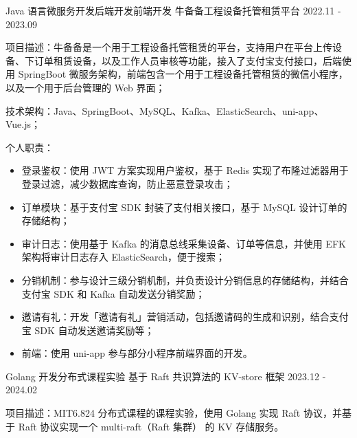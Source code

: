 \begin{cventries}
  \cventry
    {Java 语言微服务开发{\enskip\cdotp\enskip}后端开发{\enskip\cdotp\enskip}前端开发} %
    {牛备备工程设备托管租赁平台} %
    {2022.11 - 2023.09} %
    {} %
    {
      \begin{cvitems}
        \item {项目描述：牛备备是一个用于工程设备托管租赁的平台，支持用户在平台上传设备、下订单租赁设备，以及工作人员审核等功能，接入了支付宝支付接口，后端使用 SpringBoot 微服务架构，前端包含一个用于工程设备托管租赁的微信小程序，以及一个用于后台管理的 Web 界面；}
        \item {技术架构：Java、SpringBoot、MySQL、Kafka、ElasticSearch、uni-app、Vue.js；}
        \item {个人职责：}
          \begin{itemize}
            \item {登录鉴权：使用 JWT 方案实现用户鉴权，基于 Redis 实现了布隆过滤器用于登录过滤，减少数据库查询，防止恶意登录攻击；}
            \item {订单模块：基于支付宝 SDK 封装了支付相关接口，基于 MySQL 设计订单的存储结构；}
            \item {审计日志：使用基于 Kafka 的消息总线采集设备、订单等信息，并使用 EFK 架构将审计日志存入 ElasticSearch，便于搜索；}
            \item {分销机制：参与设计三级分销机制，并负责设计分销信息的存储结构，并结合支付宝 SDK 和 Kafka 自动发送分销奖励；}
            \item {邀请有礼：开发「邀请有礼」营销活动，包括邀请码的生成和识别，结合支付宝 SDK 自动发送邀请奖励等；}
            \item {前端：使用 uni-app 参与部分小程序前端界面的开发。}
          \end{itemize}
      \end{cvitems}
    }

  \cventry
    {Golang 开发{\enskip\cdotp\enskip}分布式课程实验} %
    {基于 Raft 共识算法的 KV-store 框架} %
    {2023.12 - 2024.02} %
    {} %
    {
      \begin{cvitems}
        \item {项目描述：MIT6.824 分布式课程的课程实验，使用 Golang 实现 Raft 协议，并基于 Raft 协议实现一个 multi-raft（Raft 集群） 的 KV 存储服务。}
      \end{cvitems}
    }


\end{cventries}
